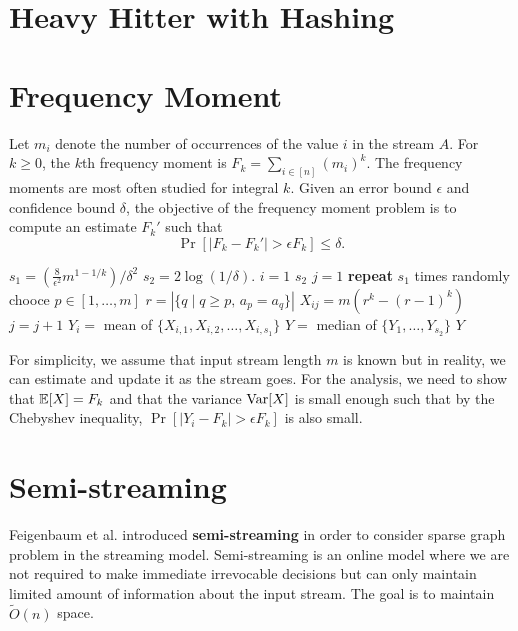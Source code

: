 



\section{Heavy Hitter with Hashing}

\section{Frequency Moment}

Let $m_i$ denote the number of occurrences of the value $i$ in the stream $A$. For $k \geq 0$, the $k$th frequency moment is $F_k = \sum_{i \in [n]}(m_i)^k$. The frequency moments are most often studied for integral $k$. Given an error bound $\epsilon$ and confidence bound $\delta$, the objective of the frequency moment problem is to compute an estimate $F_k'$ such that
$$
\Pr[|F_k - F_k'| > \epsilon F_k] \leq \delta.
$$

\begin{codebox}
    \li $s_1 = \left( \frac{8}{\epsilon^2} m^{1-1/k} \right) / \delta^2$
    \li $s_2 = 2 \log (1/\delta)$. 
    \li \For $i = 1$ \To $s_2$ \Do
        \li $j = 1$ 
        \li \textbf{repeat} $s_1$ times \Do
            \li randomly chooce $p \in [1,\ldots,m]$
            \li $r = |\{q \mid q \geq p,\, a_p = a_q \}|$
            \li $X_{ij} = m(r^k - (r-1)^k)$
            \li $j = j + 1$ 
        \End
        \li $Y_i = $ mean of $\{X_{i,1},X_{i,2},\ldots,X_{i,s_1}\}$
    \End
    \li $Y = $ median of $\{Y_1,\ldots,Y_{s_2}\}$
    \li \Return $Y$ 
\end{codebox}

For simplicity, we assume that input stream length $m$ is known but in reality, we can estimate and update it as the stream goes. For the analysis, we need to show that $\mathbb{E}[X] = F_k$ and that the variance $\mathrm{Var}[X]$ is small enough such that by the Chebyshev inequality, $\Pr[|Y_i - F_k| > \epsilon F_k]$ is also small.

\section{Semi-streaming}

Feigenbaum et al. introduced \textbf{semi-streaming} in order to consider sparse graph problem in the streaming model. Semi-streaming is an online model where we are not required to make immediate irrevocable decisions but can only maintain limited amount of information about the input stream. The goal is to maintain $\widetilde{O}(n)$ space.

